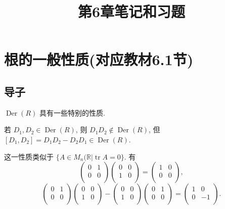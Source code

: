 \documentclass[UTF8]{ctexart}
\title{第6章笔记和习题}
\begin{document}
\maketitle
\section{根的一般性质(对应教材6.1节)}
\subsection{导子}
$\operatorname{Der}(R)$ 具有一些特别的性质.
\begin{example}
    若 $D_1,D_2\in\operatorname{Der}(R)$, 则 $D_1D_2\notin\operatorname{Der}(R)$, 但 $[D_1,D_2]=D_1D_2-D_2D_1\in\operatorname{Der}(R)$.

    这一性质类似于 $\{A\in M_n(\mathbb{R}|\operatorname{tr}A=0\}$. 有
    \[\begin{pmatrix}
        0 & 1 \\
        0 & 0 \\
    \end{pmatrix}\begin{pmatrix}
        0 & 0 \\
        1 & 0 \\
    \end{pmatrix}=\begin{pmatrix}
        1 & 0 \\
        0 & 0 \\
    \end{pmatrix},\]
    \[\begin{pmatrix}
        0 & 1 \\
        0 & 0 \\
    \end{pmatrix}\begin{pmatrix}
        0 & 0 \\
        1 & 0 \\
    \end{pmatrix}-\begin{pmatrix}
        0 & 0 \\
        1 & 0 \\
    \end{pmatrix}\begin{pmatrix}
        0 & 1 \\
        0 & 0 \\
    \end{pmatrix}=\begin{pmatrix}
        1 & 0 \\
        0 & -1 \\
    \end{pmatrix}.\]
\end{example}
\end{document}
